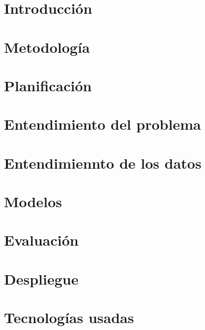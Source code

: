 \documentclass[openright,twoside,10pt]{book}
\begin{document}
\printglossary[title=Glosario de términos, toctitle=Glosario de términos]
\glsaddall
\clearpage

\printglossary[type=\acronymtype]

\chapter{Introducción}\label{cap.introduccion}


\chapter{Metodología}\label{cap.metodologia}


\chapter{Planificación}
\label{cap.req-planificacion}

\chapter{Entendimiento del problema}\label{cap.ent.problema}


\chapter{Entendimiennto de los datos}\label{cap.ent-datos}


\chapter{Modelos}\label{cap.modelos}


\chapter{Evaluación}\label{cap.test}


\chapter{Despliegue}\label{cap.despliegue}


\chapter{Tecnologías usadas}\label{cap.tecnologias}

\end{document}
